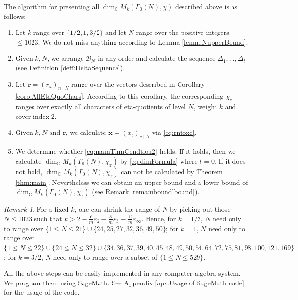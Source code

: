 \documentclass[12pt]{amsart}
\numberwithin{equation}{section}
\theoremstyle{plain}
\theoremstyle{definition}
\theoremstyle{remark}
\newtheorem{rema}[thm]{Remark}
\newcommand\numC{\mathbb{C}}
\begin{document}
The algorithm for presenting all $\dim_\numC M_{k}(\Gamma_0(N),\chi)$ described above is as follows:
\begin{enumerate}
  \item Let $k$ range over $\{1/2,1,3/2\}$ and let $N$ range over the positive integers $\leq1023$. We do not miss anything according to Lemma \ref{lemm:NupperBound}.
  \item Given $k,N$, we arrange $\mathscr{B}_N$ in any order and calculate the sequence $\Delta_1,\dots,\Delta_t$ (see Definition \ref{deff:DeltaSequence}).
  \item Let $\mathbf{r}=(r_n)_{n\mid N}$ range over the vectors described in Corollary \ref{coro:AllEtaQuoChars}. According to this corollary, the corresponding $\chi_\mathbf{r}$ ranges over exactly all characters of eta-quotients of level $N$, weight $k$ and cover index $2$.
  \item Given $k,N$ and $\mathbf{r}$, we calculate $\mathbf{x}=(x_c)_{c\mid N}$ via \eqref{eq:rntoxc}.
  \item We determine whether \eqref{eq:mainThmCondtion2} holds. If it holds, then we calculate $\dim_\numC M_{k}(\Gamma_0(N),\chi_{\mathbf{r}})$ by \eqref{eq:dimFormula} where $t=0$. If it does not hold, $\dim_\numC M_{k}(\Gamma_0(N),\chi_{\mathbf{r}})$ can not be calculated by Theorem \ref{thm:main}. Nevertheless we can obtain an upper bound and a lower bound of $\dim_\numC M_{k}(\Gamma_0(N),\chi_{\mathbf{r}})$ (see Remark \ref{rema:uboundlbound}).
\end{enumerate}
\begin{rema}
\label{rema:rangeN}
For a fixed $k$, one can shrink the range of $N$ by picking out those $N\leq1023$ such that $k>2-\frac{6}{m}\varepsilon_2-\frac{8}{m}\varepsilon_3-\frac{12}{m}\varepsilon_\infty$. Hence, for $k=1/2$, $N$ need only to range over $\{1\leq N\leq21\}\cup\{24,25,27,32,36,49,50\}$; for $k=1$, $N$ need only to range over $\{1\leq N \leq 22\}\cup\{24\leq N \leq 32\}\cup\{34,36,37,39,40,45,48,49,50,54,64,72,75,81,98,100,121,169\}$; for $k=3/2$, $N$ need only to range over a subset of $\{1\leq N \leq529\}$.
\end{rema}
All the above steps can be easily implemented in any computer algebra system. We program them using SageMath. See Appendix \ref{apx:Usage of SageMath code} for the usage of the code.
\end{document}
